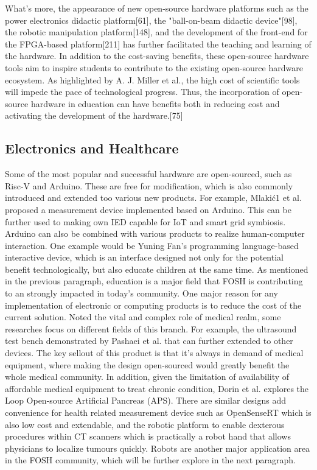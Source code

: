 \documentclass[final-report.tex]{subfiles}
\begin{document}
What's more, the appearance of new open-source hardware platforms such as the power electronics didactic platform[61], the "ball-on-beam didactic device"[98], the robotic manipulation platform[148], and the development of the front-end for the FPGA-based platform[211] has further facilitated the teaching and learning of the hardware. 
In addition to the cost-saving benefits, these open-source hardware tools aim to inspire students to contribute to the existing open-source hardware ecosystem. 
As highlighted by A. J. Miller et al., the high cost of scientific tools will impede the pace of technological progress. 
Thus, the incorporation of open-source hardware in education can have benefits both in reducing cost and activating the development of the hardware.[75]


\subsection{Electronics and Healthcare}
Some of the most popular and successful hardware are open-sourced, such as Risc-V and Arduino. 
These are free for modification, which is also commonly introduced and extended too various new products. 
For example, Mlakić1 et al. proposed a measurement device implemented based on Arduino. 
This can be further used to making own IED capable for IoT and smart grid symbiosis. 
Arduino can also be combined with various products to realize human-computer interaction. 
One example would be Yuning Fan's programming language-based interactive device, which is an interface designed not only for the potential benefit technologically, but also educate children at the same time. 
As mentioned in the previous paragraph, education is a major field that FOSH is contributing to an strongly impacted in today's community.  
One major reason for any implementation of electronic or computing products is to reduce the cost of the current solution. Noted the vital and complex role of medical realm, some researches  focus on different fields of this branch. 
For example, the ultrasound test bench demonstrated by Pashaei et al. that can further extended to other devices. 
The key sellout of this product is that it's always in demand of medical equipment, where making the design open-sourced would greatly benefit the whole medical community. 
In addition, given the limitation of availability of affordable medical equipment to treat chronic condition, Dorin et al. explores the Loop Open-source Artificial Pancreas (APS).
There are similar designs add convenience for health related measurement device such as OpenSenseRT which is also low cost and extendable,
and the robotic platform to enable dexterous procedures within CT scanners which is practically a robot hand that allows physicians to localize tumours quickly. Robots are another major application area in the FOSH community, which will be further explore in the next paragraph. 
\end{document}
